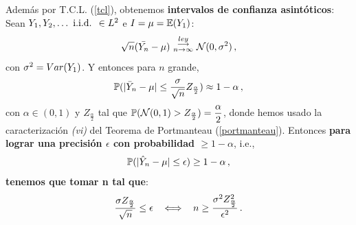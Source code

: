 Además por T.C.L. (\ref{tcl}), obtenemos \textbf{intervalos de confianza asintóticos}: Sean $Y_1,Y_2,\dots \iid\in L^2 $ e $I=\mu=\E(Y_1)$:
$$ \sqrt{n}(\bar{Y_n}-\mu)\convley\normal(0,\sigma^2) \, ,$$
con $\sigma^2=\var(Y_1)$. Y entonces para $n$ grande,
$$ \P(|\bar{Y}_n-\mu|\leq\displaystyle\frac{\sigma}{\sqrt{n}}Z_{\frac{\alpha}{2}})\approx 1-\alpha \, ,$$
con $\alpha\in(0,1)$ y $Z_{\frac{\alpha}{2}}$ tal que $\P(\normal(0,1)>Z_{\frac{\alpha}{2}})=\displaystyle\frac{\alpha}{2}$, donde hemos usado la caracterización \textit{(vi)} del Teorema de Portmanteau (\ref{portmanteau}).
\newp Entonces \textbf{para lograr una precisión $\epsilon$ con probabilidad $\geq1-\alpha$}, i.e., $$\P(|\hat{Y}_n-\mu|\leq \epsilon)\geq1-\alpha \, ,$$ \textbf{tenemos que tomar n tal que}:
$$ \displaystyle\frac{\sigma Z_{\frac{\alpha}{2}}}{\sqrt{n}}\leq\epsilon \espacio \ssi \espacio n \geq \frac{\sigma^2 Z^2_{\frac{\alpha}{2}}}{\epsilon^2} \, .$$
